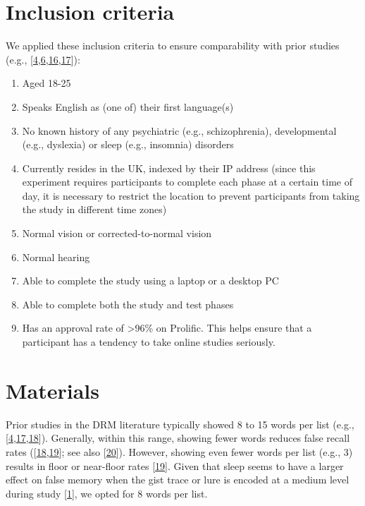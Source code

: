 \documentclass[
]{article}
\begin{document}
\hypertarget{inclusion-criteria}{%
\section{Inclusion criteria}\label{inclusion-criteria}}

We applied these inclusion criteria to ensure comparability with prior studies (e.g., {[}\protect\hyperlink{ref-fenn2009a}{4},\protect\hyperlink{ref-payne2009a}{6},\protect\hyperlink{ref-mckeon2012a}{16},\protect\hyperlink{ref-shaw2017a}{17}{]}):

\begin{enumerate}
\def\labelenumi{\arabic{enumi}.}
\item
  Aged 18-25
\item
  Speaks English as (one of) their first language(s)
\item
  No known history of any psychiatric (e.g., schizophrenia), developmental (e.g., dyslexia) or sleep (e.g., insomnia) disorders
\item
  Currently resides in the UK, indexed by their IP address (since this experiment requires participants to complete each phase at a certain time of day, it is necessary to restrict the location to prevent participants from taking the study in different time zones)
\item
  Normal vision or corrected-to-normal vision
\item
  Normal hearing
\item
  Able to complete the study using a laptop or a desktop PC
\item
  Able to complete both the study and test phases
\item
  Has an approval rate of \textgreater96\% on Prolific. This helps ensure that a participant has a tendency to take online studies seriously.
\end{enumerate}

\hypertarget{materials}{%
\section{Materials}\label{materials}}

Prior studies in the DRM literature typically showed 8 to 15 words per list (e.g., {[}\protect\hyperlink{ref-fenn2009a}{4},\protect\hyperlink{ref-shaw2017a}{17},\protect\hyperlink{ref-swannell2013a}{18}{]}). Generally, within this range, showing fewer words reduces false recall rates ({[}\protect\hyperlink{ref-swannell2013a}{18},\protect\hyperlink{ref-robinson1997a}{19}{]}; see also {[}\protect\hyperlink{ref-alakbarova2021a}{20}{]}). However, showing even fewer words per list (e.g., 3) results in floor or near-floor rates {[}\protect\hyperlink{ref-robinson1997a}{19}{]}. Given that sleep seems to have a larger effect on false memory when the gist trace or lure is encoded at a medium level during study {[}\protect\hyperlink{ref-newbury2019a}{1}{]}, we opted for 8 words per list.
\end{document}
